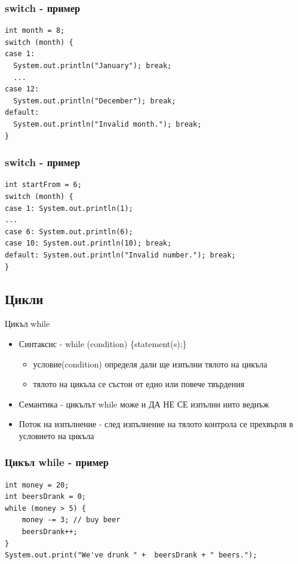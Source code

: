 \documentclass{beamer}
\begin{document}
\begin{frame}[fragile]
  \transdissolve
  \frametitle{switch - пример}
\begin{lstlisting}
int month = 8;
switch (month) {
case 1: 
  System.out.println("January"); break;
  ...
case 12:
  System.out.println("December"); break;
default: 
  System.out.println("Invalid month."); break;
}
\end{lstlisting}
\end{frame}

\begin{frame}[fragile]
  \frametitle{switch - пример}
  \transdissolve
\begin{lstlisting}
int startFrom = 6;
switch (month) {
case 1: System.out.println(1);
...
case 6: System.out.println(6);
case 10: System.out.println(10); break;
default: System.out.println("Invalid number."); break;
}
\end{lstlisting}
\end{frame}

\subsection{Цикли}

\begin{frame}{Цикъл while}
  \transdissolve
  \begin{itemize}
  \item Синтаксис - while (condition) \{statement(s);\}
    \begin{itemize}
      \item условие(condition) определя дали ще изпълни тялото на цикъла
      \item тялото на цикъла се състои от едно или повече твърдения
    \end{itemize}

  \item Семантика - цикълът while може и ДА НЕ СЕ изпълни нито веднъж
  \item Поток на изпълнение - след изпълнение на тялото контрола се
    прехвърля в условието на цикъла
  \end{itemize}
\end{frame}

\begin{frame}[fragile]
  \frametitle{Цикъл while - пример}
  \transdissolve
\begin{lstlisting}
int money = 20;
int beersDrank = 0;
while (money > 5) {
    money -= 3; // buy beer
    beersDrank++;
}
System.out.print("We've drunk " +  beersDrank + " beers.");
\end{lstlisting}
\end{frame}
\end{document}

